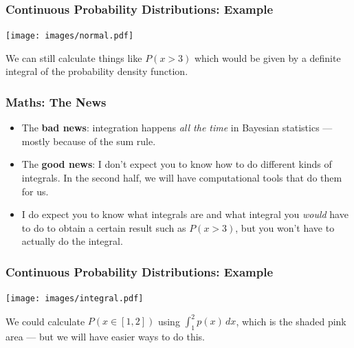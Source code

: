 \documentclass{beamer}
\begin{document}
\begin{frame}
\frametitle{Continuous Probability Distributions: Example}

\begin{center}
\texttt{[image: images/normal.pdf]}
\end{center}

We can still calculate things like $P(x > 3)$ which would be
given by a definite integral of the probability density function.

\end{frame}

\begin{frame}
\frametitle{Maths: The News}
\begin{itemize}
\item The {\bf bad news}: integration happens {\em all the time} in Bayesian
statistics --- mostly because of the sum rule. \\[0.5em]\pause
\item The {\bf good news}: I don't expect you to know how to do different
kinds of integrals. In the second half, we will have computational tools that
do them for us.\\[0.5em]\pause
\item I do expect you to know what integrals are and what integral you
{\em would} have to do to obtain a certain result such as $P(x > 3)$, but you
won't have to actually do the integral.
\end{itemize}

\end{frame}


\begin{frame}
\frametitle{Continuous Probability Distributions: Example}

\begin{center}
\texttt{[image: images/integral.pdf]}
\end{center}
We could calculate $P(x \in [1, 2])$ using $\int_1^2 p(x) \, dx$, which is
the shaded pink area --- but we will have easier ways to do this.


\end{frame}
\end{document}
